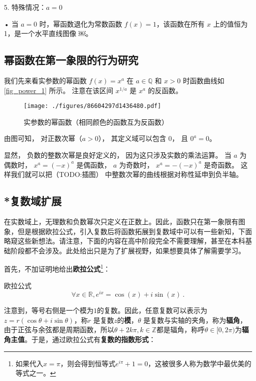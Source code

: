 5. 特殊情况：$a = 0$

	•	当 $a = 0$ 时，幂函数退化为常数函数 $f(x) = 1$，该函数在所有 $x$ 上的值恒为 1，是一个水平直线图像 ￼。



\subsection{幂函数在第一象限的行为研究}


我们先来看实参数的幂函数 $f(x) = x^a$ 在 $a\in\mathbb Q$ 和 $x > 0$ 时函数曲线如\autoref{fig_power_1} 所示。 注意在该区间 $x^{1/a}$ 是 $x^a$ 的反函数。

\begin{figure}[ht]
\centering
\texttt{[image: ./figures/86604297d1436480.pdf]}
\caption{实参数的幂函数（相同颜色的函数互为反函数）}\label{fig_power_1}
\end{figure}

由图可知， 对正数次幂（$a > 0$）， 其定义域可以包含 $0$， 且 $0^a = 0$。

显然， 负数的整数次幂是良好定义的， 因为这只涉及实数的乘法运算。 当 $a$ 为偶数时， $x^a = (-x)^a$ 是偶函数， $a$ 为奇数时， $x^a = -(-x)^a$ 是奇函数。 这样我们就可以把（TODO:插图） 中整数次幂的曲线根据对称性延申到负半轴。




\subsection{*复数域扩展}

在实数域上，无理数和负数幂次只定义在正数上。因此，函数只在第一象限有图象，但是根据欧拉公式，引入复数后将函数拓展到复数域中可以有一些新知，下面略窥这些新想法。请注意，下面的内容在高中阶段完全不需要理解，甚至在本科基础阶段都不会涉及。此处给出只是为了扩展视野，如果想要具体了解需要学习。

首先，不加证明地给出\textbf{欧拉公式}\footnote{如果代入$x=\pi$，则会得到恒等式$e^{i\pi}+1=0$，这被很多人称为数学中最优美的等式之一。}：

\begin{theorem}{欧拉公式}
\begin{equation}
\forall x\in\mathbb{R},e^{ix} = \cos(x) + i\sin(x)~.
\end{equation}
\end{theorem}

注意到，等号右侧是一个模为$1$的复数。因此，任意复数可以表示为 $z = r (\cos \theta + i \sin \theta)$，称$r$ 是复数$z$的\textbf{模}，$\theta$ 是复数与实轴的夹角，称为\textbf{辐角}，由于正弦与余弦都是周期函数，所以$\theta+2k\pi,k\in\mathbb{Z}$都是辐角，称呼$\theta\in[0,2\pi)$为\textbf{辐角主值}。于是，通过欧拉公式有\textbf{复数的指数形式}：

